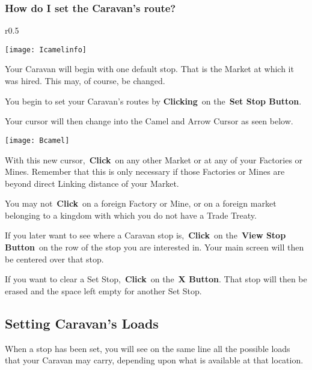 \subsubsection{How do I set the Caravan’s route?}

\begin{wrapfigure}{r}{0.5\textwidth}
	\vspace{-20pt}
	\begin{center}
		\texttt{[image: Icamelinfo]}
	\end{center}
	\vspace{-20pt}
\end{wrapfigure}

Your Caravan will begin with one default stop. That is the Market at which it was hired. This may, of course, be changed.

You begin to set your Caravan’s routes by \textbf{Clicking} on the \textbf{Set Stop Button}.

Your cursor will then change into the Camel and Arrow Cursor as seen below.

\texttt{[image: Bcamel]}


With this new cursor, \textbf{Click} on any other Market or at any of your Factories or Mines. Remember that this is only necessary if those Factories or Mines are beyond direct Linking distance of your Market.

You may not \textbf{Click} on a foreign Factory or Mine, or on a foreign market belonging to a kingdom with which you do not have a Trade Treaty.

If you later want to see where a Caravan stop is, \textbf{Click} on the \textbf{View Stop Button} on the row of the stop you are interested in. Your main screen will then be centered over that stop.

If you want to clear a Set Stop, \textbf{Click} on the \textbf{X Button}. That stop will then be erased and the space left empty for another Set Stop.

\subsection{Setting Caravan’s Loads}


When a stop has been set, you will see on the same line all the possible loads that your Caravan may carry, depending upon what is available at that location.

